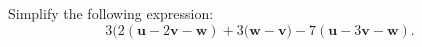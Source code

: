 \documentclass[20pt,a4paper]{extarticle}
\newcounter{example}
\begin{document}
\begin{example}
Simplify the following expression:
	\[
		3 \big( 2 (\mathbf{u} - 2 \mathbf{v} - \mathbf{w} ) + 3 (\mathbf{w} - \mathbf{v} \big) - 7 ( \mathbf{u} - 3 \mathbf{v} - \mathbf{w} ) .
	\]
\end{example}

\begin{solution}

\end{solution}

\newpage 

\phantom{2} 
\end{document}
